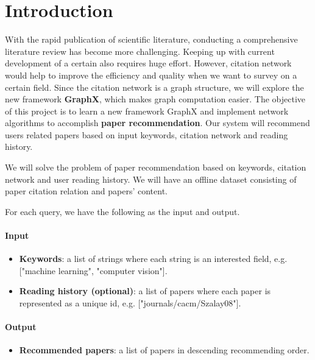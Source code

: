 \section{Introduction}

With the rapid publication of scientific literature, conducting a comprehensive literature review has become more challenging. Keeping up with current development of a certain also requires huge effort. However, citation network would help to improve the efficiency and quality when we want to survey on a certain field. Since the citation network is a graph structure, we will explore the new framework \textbf{GraphX}, which makes graph computation easier. The objective of this project is to learn a new framework GraphX and implement network algorithms to accomplish \textbf{paper recommendation}. Our system will recommend users related papers based on input keywords, citation network and reading history. 

We will solve the problem of paper recommendation based on keywords, citation network and user reading history. 
We will have an offline dataset consisting of paper citation relation and papers' content.

For each query, we have the following as the input and output.

\paragraph{Input}
\begin{itemize}
  \item \textbf{Keywords}: a list of strings where each string is an interested field, e.g. ["machine learning", "computer vision"].
  \item \textbf{Reading history (optional)}: a list of papers where each paper is represented as a unique id, e.g. ["journals/cacm/Szalay08"].
\end{itemize}

\paragraph{Output}
\begin{itemize}
  \item \textbf{Recommended papers}: a list of papers in descending recommending order.
\end{itemize}